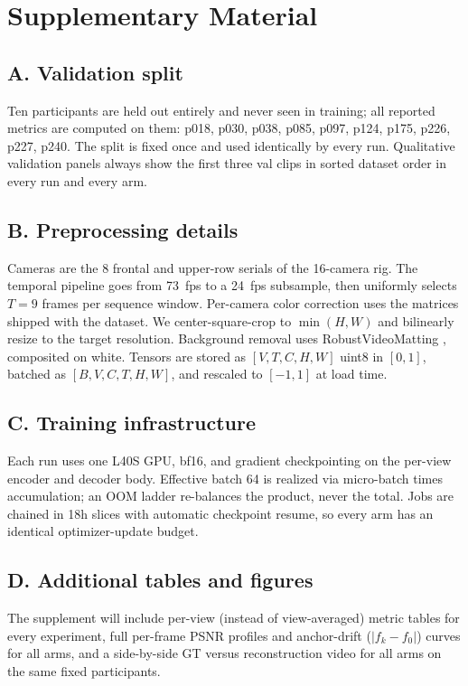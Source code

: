 \clearpage
\appendix
\section*{Supplementary Material}

\subsection*{A. Validation split}

Ten participants are held out entirely and never seen in training; all reported metrics are computed on them: p018, p030, p038, p085, p097, p124, p175, p226, p227, p240. The split is fixed once and used identically by every run. Qualitative validation panels always show the first three val clips in sorted dataset order in every run and every arm.

\subsection*{B. Preprocessing details}

Cameras are the 8 frontal and upper-row serials of the 16-camera rig. The temporal pipeline goes from 73~fps to a 24~fps subsample, then uniformly selects $T{=}9$ frames per sequence window. Per-camera color correction uses the matrices shipped with the dataset. We center-square-crop to $\min(H,W)$ and bilinearly resize to the target resolution. Background removal uses RobustVideoMatting \cite{lin2022robust}, composited on white. Tensors are stored as $[V, T, C, H, W]$ uint8 in $[0,1]$, batched as $[B, V, C, T, H, W]$, and rescaled to $[-1,1]$ at load time.

\subsection*{C. Training infrastructure}

Each run uses one L40S GPU, bf16, and gradient checkpointing on the per-view encoder and decoder body. Effective batch 64 is realized via micro-batch times accumulation; an OOM ladder re-balances the product, never the total. Jobs are chained in 18h slices with automatic checkpoint resume, so every arm has an identical optimizer-update budget.

\subsection*{D. Additional tables and figures}

The supplement will include per-view (instead of view-averaged) metric tables for every experiment, full per-frame PSNR profiles and anchor-drift ($|f_k-f_0|$) curves for all arms, and a side-by-side GT versus reconstruction video for all arms on the same fixed participants.
